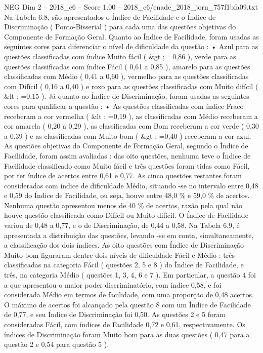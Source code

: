 \begin{textsample}{NEG Dim 2 – 2018\_c6 – Score 1.00 – 2018\_c6/enade\_2018\_jorn\_757f1bfa09.txt}
Na Tabela 6.8, são apresentados o Índice de Facilidade e o Índice de Discriminação ( Ponto-Bisserial ) para cada uma das questões objetivas do Componente de Formação Geral.
Quanto ao Índice de Facilidade, foram usadas as seguintes cores para diferenciar o nível de dificuldade da questão : • Azul para as questões classificadas com índice Muito fácil ( \&gt ; =0,86 ), verde para as questões classificadas com índice Fácil ( 0,61 a 0,85 ), amarelo para as questões classificadas com Médio ( 0,41 a 0,60 ), vermelho para as questões classificadas com Difícil ( 0,16 a 0,40 ) e roxo para as questões classificadas com Muito difícil ( \&lt ; =0,15 ).
Já quanto ao Índice de Discriminação, foram usadas as seguintes cores para qualificar a questão : • As questões classificadas com índice Fraco receberam a cor vermelha ( \&lt ; =0,19 ), as classificadas com Médio receberam a cor amarela ( 0,20 a 0,29 ), as classificadas com Bom receberam a cor verde ( 0,30 a 0,39 ) e as classificadas com Muito bom ( \&gt ; =0,40 ) receberam a cor azul.
As questões objetivas do Componente de Formação Geral, segundo o Índice de Facilidade, foram assim avaliadas : das oito questões, nenhuma teve o Índice de Facilidade classificado como Muito fácil e três questões foram tidas como Fácil, por ter índice de acertos entre 0,61 e 0,77.
As cinco questões restantes foram consideradas com índice de dificuldade Médio, situando -se no intervalo entre 0,48 e 0,59 do Índice de Facilidade, ou seja, houve entre 48,0 \% e 59,0 \% de acertos.
Nenhuma questão apresentou menos de 40 \% de acertos, razão pela qual não houve questão classificada como Difícil ou Muito difícil.
O Índice de Facilidade variou de 0,48 a 0,77, e o de Discriminação, de 0,44 a 0,58.
Na Tabela 6.9, é apresentada a distribuição das questões, levando -se em conta, simultaneamente, a classificação dos dois índices.
As oito questões com Índice de Discriminação Muito bom figuraram dentre dois níveis de dificuldade Fácil e Médio : três classificadas na categoria Fácil ( questões 2, 5 e 8 ) do Índice de Facilidade, e três, na categoria Médio ( questões 1, 3, 4, 6 e 7 ).
Em particular, a questão 4 foi a que apresentou o maior poder discriminatório, com índice 0,58, e foi considerada Médio em termos de facilidade, com uma proporção de 0,48 acertos.
O máximo de acertos foi alcançado pela questão 8 com um Índice de Facilidade de 0,77, e seu Índice de Discriminação foi 0,50.
As questões 2 e 5 foram consideradas Fácil, com índices de Facilidade 0,72 e 0,61, respectivamente.
Os índices de Discriminação foram Muito bom para as duas questões ( 0,47 para a questão 2 e 0,54 para questão 5 ).

\end{textsample}
